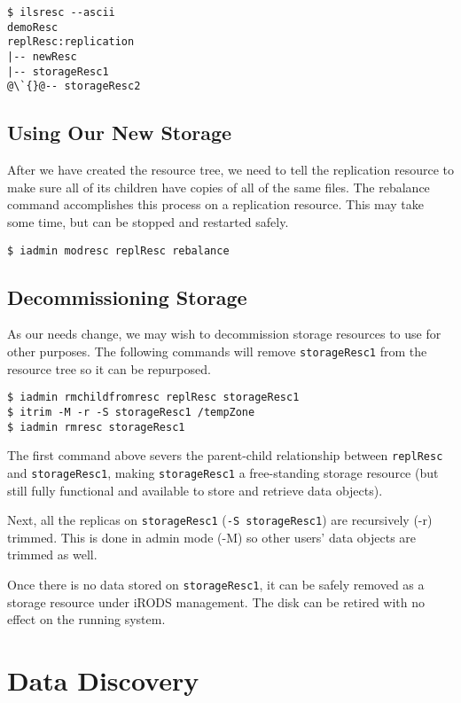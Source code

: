 \documentclass[10pt,oneside]{memoir}
\begin{document}
\begin{lstlisting}
$ ilsresc --ascii
demoResc
replResc:replication
|-- newResc
|-- storageResc1
@\`{}@-- storageResc2
\end{lstlisting}

\section{Using Our New Storage}

After we have created the resource tree, we need to tell the replication resource to make sure all of its children have copies of all of the same files. The rebalance command accomplishes this process on a replication resource. This may take some time, but can be stopped and restarted safely.

\begin{lstlisting}
$ iadmin modresc replResc rebalance
\end{lstlisting}

\section{Decommissioning Storage}
As our needs change, we may wish to decommission storage resources to use for other purposes. The following commands will remove \texttt{storageResc1} from the resource tree so it can be repurposed.

\begin{lstlisting}
$ iadmin rmchildfromresc replResc storageResc1
$ itrim -M -r -S storageResc1 /tempZone
$ iadmin rmresc storageResc1
\end{lstlisting}

The first command above severs the parent-child relationship between \texttt{replResc} and \texttt{storageResc1}, making \texttt{storageResc1} a free-standing storage resource (but still fully functional and available to store and retrieve data objects).

Next, all the replicas on \texttt{storageResc1} (\texttt{-S storageResc1}) are recursively (-r) trimmed. This is done in admin mode (-M) so other users' data objects are trimmed as well.

Once there is no data stored on \texttt{storageResc1}, it can be safely removed as a storage resource under iRODS management. The disk can be retired with no effect on the running system.





\chapter{Data Discovery}
\end{document}

